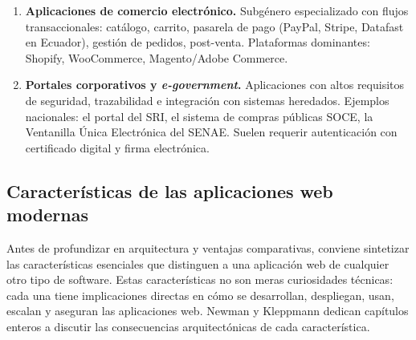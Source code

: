 \documentclass[11pt,a4paper,openany]{book}
\begin{document}
\begin{enumerate}
\item \textbf{Aplicaciones de comercio electrónico.} Subgénero
especializado con flujos transaccionales: catálogo, carrito, pasarela
de pago (PayPal, Stripe, Datafast en Ecuador), gestión de pedidos,
post-venta. Plataformas dominantes: Shopify, WooCommerce,
Magento/Adobe Commerce.

\item \textbf{Portales corporativos y \emph{e-government}.}
Aplicaciones con altos requisitos de seguridad, trazabilidad e
integración con sistemas heredados. Ejemplos nacionales: el portal
del SRI, el sistema de compras públicas SOCE, la Ventanilla Única
Electrónica del SENAE. Suelen requerir autenticación con certificado
digital y firma electrónica.
\end{enumerate}

\subsection{Características de las aplicaciones web modernas}

Antes de profundizar en arquitectura y ventajas comparativas, conviene
sintetizar las características esenciales que distinguen a una
aplicación web de cualquier otro tipo de software. Estas
características no son meras curiosidades técnicas: cada una tiene
implicaciones directas en cómo se desarrollan, despliegan, usan,
escalan y aseguran las aplicaciones web. Newman \cite{newman2021building}
y Kleppmann \cite{kleppmann2017designing} dedican capítulos enteros a
discutir las consecuencias arquitectónicas de cada característica.
\end{document}
